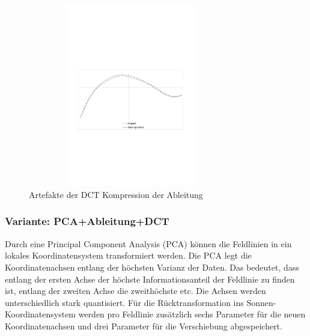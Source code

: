 \begin{figure}[!htbp]
	\center
	\includegraphics[trim = 1.8cm 9.5cm 1.8cm 11cm, clip=true,width=0.8\textwidth,height=8cm,keepaspectratio]{./pictures/resultate/loesung1/loesung1-6/artefakte.pdf}
	\caption{Artefakte der DCT Kompression der Ableitung}
	\label{resultate:loesung1:dct:byte:artefakte}
\end{figure} 

\subsubsection{Variante: PCA+Ableitung+DCT}
Durch eine Principal Component Analysis (PCA) \cite{abdi2010principal} können die Feldlinien in ein lokales Koordinatensystem transformiert werden. Die PCA legt die Koordinatenachsen entlang der höchsten Varianz der Daten. Das bedeutet, dass entlang der ersten Achse der höchste Informationsanteil der Feldlinie zu finden ist, entlang der zweiten Achse die zweithöchste etc. Die Achsen werden unterschiedlich stark quantisiert. Für die Rücktransformation ins Sonnen-Koordinatensystem werden pro Feldlinie zusätzlich sechs Parameter für die neuen Koordinatenachsen und drei Parameter für die Verschiebung abgespeichert.

